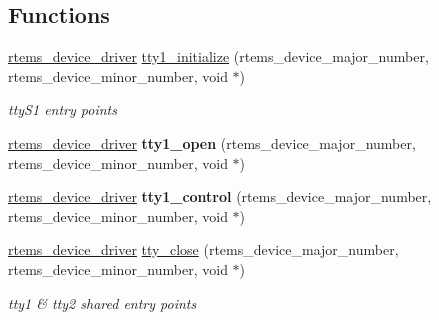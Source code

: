 \subsection*{Functions}
\begin{DoxyCompactItemize}
\item 
\mbox{\label{group__i386__tty_ga9849440de837696ce9155a063d69db5b}} 
\mbox{\hyperlink{group__ClassicStatus_ga545d41846817eaba6143d52ee4d9e9fe}{rtems\+\_\+device\+\_\+driver}} \mbox{\hyperlink{group__i386__tty_ga9849440de837696ce9155a063d69db5b}{tty1\+\_\+initialize}} (rtems\+\_\+device\+\_\+major\+\_\+number, rtems\+\_\+device\+\_\+minor\+\_\+number, void $\ast$)
\begin{DoxyCompactList}\small\item\em tty\+S1 entry points \end{DoxyCompactList}\item 
\mbox{\label{group__i386__tty_gac2a7db91a4d849622ee0f0a80759bc06}} 
\mbox{\hyperlink{group__ClassicStatus_ga545d41846817eaba6143d52ee4d9e9fe}{rtems\+\_\+device\+\_\+driver}} {\bfseries tty1\+\_\+open} (rtems\+\_\+device\+\_\+major\+\_\+number, rtems\+\_\+device\+\_\+minor\+\_\+number, void $\ast$)
\item 
\mbox{\label{group__i386__tty_gaca4cd3f312ce558064e0fbfd2a791bbb}} 
\mbox{\hyperlink{group__ClassicStatus_ga545d41846817eaba6143d52ee4d9e9fe}{rtems\+\_\+device\+\_\+driver}} {\bfseries tty1\+\_\+control} (rtems\+\_\+device\+\_\+major\+\_\+number, rtems\+\_\+device\+\_\+minor\+\_\+number, void $\ast$)
\item 
\mbox{\label{group__i386__tty_ga10756309126cd53d00dea24f17888f9d}} 
\mbox{\hyperlink{group__ClassicStatus_ga545d41846817eaba6143d52ee4d9e9fe}{rtems\+\_\+device\+\_\+driver}} \mbox{\hyperlink{group__i386__tty_ga10756309126cd53d00dea24f17888f9d}{tty\+\_\+close}} (rtems\+\_\+device\+\_\+major\+\_\+number, rtems\+\_\+device\+\_\+minor\+\_\+number, void $\ast$)
\begin{DoxyCompactList}\small\item\em tty1 \& tty2 shared entry points \end{DoxyCompactList}\item 
\mbox{\label{group__i386__tty_ga840f2230ab9780d45e0ca311ef5ff21f}} 

\end{DoxyCompactItemize}
